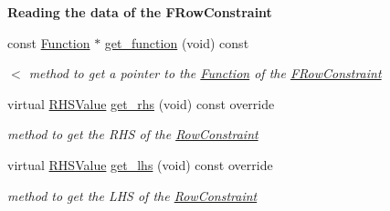 \begin{Indent}\textbf{ Reading the data of the F\+Row\+Constraint}\par
\begin{DoxyCompactItemize}
\item 
\mbox{\label{class_s_m_spp__di__unipi__it_1_1_f_row_constraint_ac2fbb181b2e26b1b8096d21fdf32e52d}} 
const \mbox{\hyperlink{class_s_m_spp__di__unipi__it_1_1_function}{Function}} $\ast$ \mbox{\hyperlink{class_s_m_spp__di__unipi__it_1_1_f_row_constraint_ac2fbb181b2e26b1b8096d21fdf32e52d}{get\+\_\+function}} (void) const
\begin{DoxyCompactList}\small\item\em $<$ method to get a pointer to the \mbox{\hyperlink{class_s_m_spp__di__unipi__it_1_1_function}{Function}} of the \mbox{\hyperlink{class_s_m_spp__di__unipi__it_1_1_f_row_constraint}{F\+Row\+Constraint}} \end{DoxyCompactList}\item 
\mbox{\label{class_s_m_spp__di__unipi__it_1_1_f_row_constraint_a4db733da609a6f1b6c1ce13783b7f717}} 
virtual \mbox{\hyperlink{class_s_m_spp__di__unipi__it_1_1_row_constraint_a8813536ab3b13a81c8e83a999ade3bd8}{R\+H\+S\+Value}} \mbox{\hyperlink{class_s_m_spp__di__unipi__it_1_1_f_row_constraint_a4db733da609a6f1b6c1ce13783b7f717}{get\+\_\+rhs}} (void) const override
\begin{DoxyCompactList}\small\item\em method to get the R\+HS of the \mbox{\hyperlink{class_s_m_spp__di__unipi__it_1_1_row_constraint}{Row\+Constraint}} \end{DoxyCompactList}\item 
\mbox{\label{class_s_m_spp__di__unipi__it_1_1_f_row_constraint_aa5354990927a7b2533dd638c2facdd81}} 
virtual \mbox{\hyperlink{class_s_m_spp__di__unipi__it_1_1_row_constraint_a8813536ab3b13a81c8e83a999ade3bd8}{R\+H\+S\+Value}} \mbox{\hyperlink{class_s_m_spp__di__unipi__it_1_1_f_row_constraint_aa5354990927a7b2533dd638c2facdd81}{get\+\_\+lhs}} (void) const override
\begin{DoxyCompactList}\small\item\em method to get the L\+HS of the \mbox{\hyperlink{class_s_m_spp__di__unipi__it_1_1_row_constraint}{Row\+Constraint}} \end{DoxyCompactList}\end{DoxyCompactItemize}
\end{Indent}
